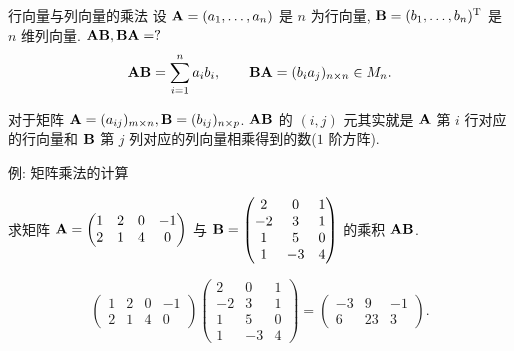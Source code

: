 \begin{frame}{行向量与列向量的乘法}
	\onslide<+->
	设 ${\mathbf{A}}=(a_1,\dots,a_n)$ 是 $n$ 为行向量, ${\mathbf{B}}=(b_1,\dots,b_n)^{\mathrm{T}}$ 是 $n$ 维列向量.
	\onslide<+->
	${\mathbf{A}}{\mathbf{B}},{\mathbf{B}}{\mathbf{A}}=?$
	\onslide<+->
	\[{\mathbf{A}}{\mathbf{B}}=\sum_{i=1}^n a_i b_i,\qquad
	{\mathbf{B}}{\mathbf{A}}=(b_ia_j)_{n\times n}\in M_n.\]

	\onslide<+->
	对于矩阵 ${\mathbf{A}}=(a_{ij})_{m\times n}, {\mathbf{B}}=(b_{ij})_{n\times p}$.
	\onslide<+->
	${\mathbf{A}}{\mathbf{B}}$ 的 $(i,j)$ 元其实就是 ${\mathbf{A}}$ 第 $i$ 行对应的行向量和 ${\mathbf{B}}$ 第 $j$ 列对应的列向量相乘得到的数($1$ 阶方阵).
\end{frame}


\begin{frame}{例: 矩阵乘法的计算}
	\onslide<+->
	\begin{example}
		求矩阵 ${\mathbf{A}}=\begin{pmatrix}
			1&2&0&-1\\2&1&4&0
		\end{pmatrix}$ 与 ${\mathbf{B}}=\begin{pmatrix}
			2&0&1\\
			-2&3&1\\
			1&5&0\\
			1&-3&4
		\end{pmatrix}$ 的乘积 ${\mathbf{A}}{\mathbf{B}}$.
	\end{example}
	\onslide<+->
	\begin{solution}
		\[\begin{pmatrix}
			1&2&0&-1\\2&1&4&0
		\end{pmatrix}\begin{pmatrix}
			2&0&1\\
			-2&3&1\\
			1&5&0\\
			1&-3&4
		\end{pmatrix}=\begin{pmatrix}
			-3&9&-1\\
			6&23&3
		\end{pmatrix}.\]
	\end{solution}
\end{frame}


